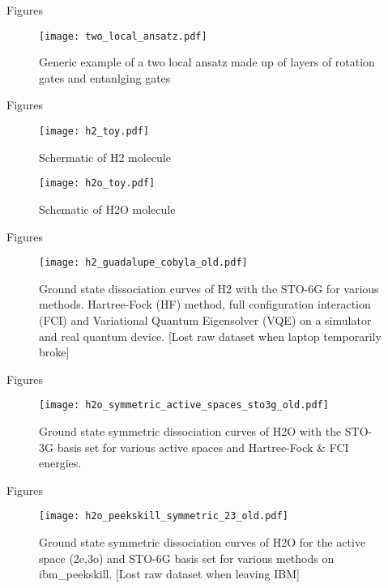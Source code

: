 \begin{frame}{Figures}
  \begin{center}
    \begin{figure}
      \begin{center}
        \texttt{[image: two\_local\_ansatz.pdf]}
      \end{center}
      \caption{Generic example of a two local ansatz made up of layers of rotation gates and entanlging gates}\label{fig:two_local_ansatz}
    \end{figure}
  \end{center}
\end{frame}


\begin{frame}{Figures}
    \begin{figure}
      \centering
      \texttt{[image: h2\_toy.pdf]}
      \caption{Schermatic of H2 molecule}
    \end{figure}

    \begin{figure}
      \centering
      \texttt{[image: h2o\_toy.pdf]}
      \caption{Schematic of H2O molecule}
    \end{figure}
\end{frame}

\begin{frame}{Figures}
    \begin{figure}
      \centering
      \texttt{[image: h2\_guadalupe\_cobyla\_old.pdf]}
      \caption{
        Ground state dissociation curves of H2 with the STO-6G for various methods. Hartree-Fock (HF) method,
        full configuration interaction (FCI) and Variational Quantum Eigensolver (VQE) on a simulator and real quantum
        device. [Lost raw dataset when laptop temporarily broke]
      }
    \end{figure}
\end{frame}

\begin{frame}{Figures}
    \begin{figure}
      \centering
      \texttt{[image: h2o\_symmetric\_active\_spaces\_sto3g\_old.pdf]}
      \caption{
        Ground state symmetric dissociation curves of H2O with the STO-3G basis set for various active spaces and
        Hartree-Fock & FCI energies.
      }
    \end{figure}
\end{frame}

\begin{frame}{Figures}
    \begin{figure}
      \centering
      \texttt{[image: h2o\_peekskill\_symmetric\_23\_old.pdf]}
      \caption{
        Ground state symmetric dissociation curves of H2O for the active space (2e,3o) and STO-6G basis set for various methods on ibm_peekskill.
        [Lost raw dataset when leaving IBM]
      }
    \end{figure}
\end{frame}
